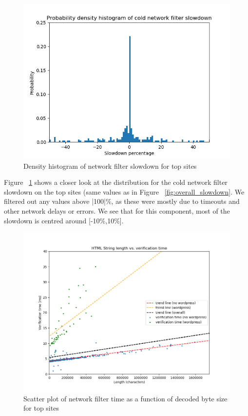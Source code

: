 \begin{figure}[h]
	\includegraphics[scale=0.5]{results/density_histogram_filter_slowdown}
	\caption{Density histogram of network filter slowdown for top sites}
	\label{fig:histogram_slowdown}
\end{figure}


Figure ~\ref{fig:histogram_slowdown} shows a closer look at the distribution for the cold network filter slowdown on the top sites (same values as in Figure ~\ref{fig:overall_slowdown}. We filtered out any values above |100|\%, as these were mostly due to timeouts and other network delays or errors. We see that for this component, most of the slowdown is centred around [-10\%,10\%].

\begin{figure}[h]
	\includegraphics[scale=0.37]{results/string_length_vs_verification_time}
	\caption{Scatter plot of network filter time as a function of decoded byte size for top sites}
	\label{fig:verification_time_string_length}
\end{figure}

